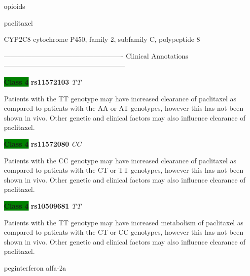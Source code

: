 \documentclass{resume} %
\begin{document}
\begin{rSection}{ opioids }
\end{rSection}\begin{rSection}{ paclitaxel }
\item[]

\begin{rSubsection}{ CYP2C8 }{ cytochrome P450, family 2, subfamily C, polypeptide 8 }{}{}
\item[]

\item[] ---------------------------------------------------- Clinical Annotations -----------------------------------------------------\newline
\item \textbf{\colorbox{green} {Class 4}} \textbf{ rs11572103 } \textit{ TT }
\item[] Patients with the TT genotype may have increased clearance of paclitaxel as compared to patients with the AA or AT genotypes, however this has not been shown in vivo. Other genetic and clinical factors may also influence clearance of paclitaxel.\item \textbf{\colorbox{green} {Class 4}} \textbf{ rs11572080 } \textit{ CC }
\item[] Patients with the CC genotype may have increased clearance of paclitaxel as compared to patients with the CT or TT genotypes, however this has not been shown in vivo. Other genetic and clinical factors may also influence clearance of paclitaxel.\item \textbf{\colorbox{green} {Class 4}} \textbf{ rs10509681 } \textit{ TT }
\item[] Patients with the TT genotype may have increased metabolism of paclitaxel as compared to patients with the CT or CC genotypes, however this has not been shown in vivo. Other genetic and clinical factors may also influence clearance of paclitaxel.
\end{rSubsection}

\end{rSection}\begin{rSection}{ peginterferon alfa-2a }
\item[]


\end{rSection}
\end{document}
